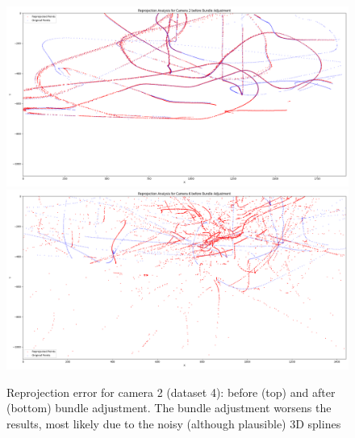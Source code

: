 \documentclass[11pt]{article}
\begin{document}
\begin{figure}[h]
    \centering
    \includegraphics[width=\textwidth]{imgs/online_no_ba_cam2.png}
    \includegraphics[width=\textwidth]{imgs/online_ba_cam2.png}
    \caption{Reprojection error for camera 2 (dataset 4): before (top) and after (bottom) bundle adjustment. The bundle adjustment worsens the results, most likely due to the noisy (although plausible) 3D splines}
    \label{fig:bad_ba_online}
\end{figure}
\end{document}
